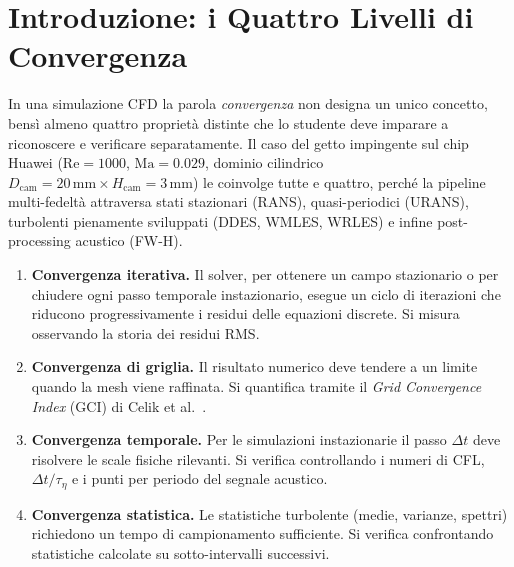 \documentclass[11pt,a4paper]{article}
\newcommand{\Dcam}{D_{\mathrm{cam}}}
\newcommand{\Hcam}{H_{\mathrm{cam}}}
\newcommand{\Rey}{\mathrm{Re}}
\newcommand{\Ma}{\mathrm{Ma}}
\begin{document}
\tableofcontents
\newpage

\section{Introduzione: i Quattro Livelli di Convergenza}
\label{sec:intro}

In una simulazione CFD la parola \emph{convergenza} non designa un
unico concetto, bensì almeno quattro proprietà distinte che lo
studente deve imparare a riconoscere e verificare separatamente. Il
caso del getto impingente sul chip Huawei ($\Rey=1000$,
$\Ma=0.029$, dominio cilindrico $\Dcam=20\mathrm{\,mm} \times
\Hcam=3\mathrm{\,mm}$) le coinvolge tutte e quattro, perché la
pipeline multi-fedeltà attraversa stati stazionari (RANS),
quasi-periodici (URANS), turbolenti pienamente sviluppati (DDES,
WMLES, WRLES) e infine post-processing acustico (FW-H).

\begin{infobox}
\begin{enumerate}
  \item \textbf{Convergenza iterativa.} Il solver, per ottenere un campo
    stazionario o per chiudere ogni passo temporale instazionario, esegue
    un ciclo di iterazioni che riducono progressivamente i residui delle
    equazioni discrete. Si misura osservando la storia dei residui RMS.

  \item \textbf{Convergenza di griglia.} Il risultato numerico deve
    tendere a un limite quando la mesh viene raffinata. Si quantifica
    tramite il \emph{Grid Convergence Index} (GCI) di Celik et
    al.~\cite{Celik2008}.

  \item \textbf{Convergenza temporale.} Per le simulazioni
    instazionarie il passo $\Delta t$ deve risolvere le scale fisiche
    rilevanti. Si verifica controllando i numeri di CFL,
    $\Delta t/\tau_\eta$ e i punti per periodo del segnale acustico.

  \item \textbf{Convergenza statistica.} Le statistiche turbolente
    (medie, varianze, spettri) richiedono un tempo di campionamento
    sufficiente. Si verifica confrontando statistiche calcolate su
    sotto-intervalli successivi.
\end{enumerate}
\end{infobox}
\end{document}
